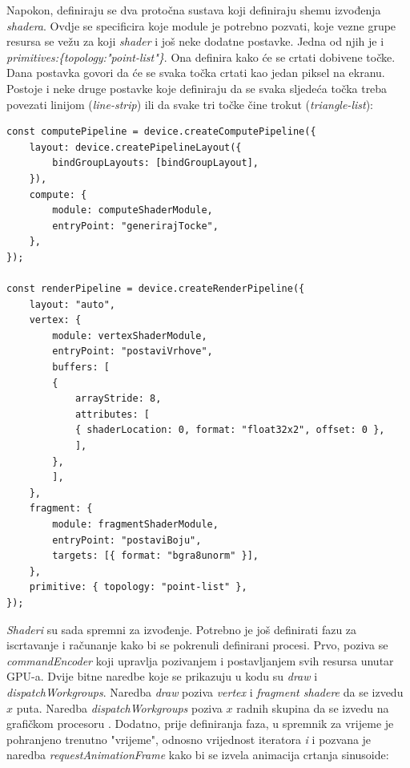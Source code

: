 \documentclass{foi}
\begin{document}
Napokon, definiraju se dva protočna sustava koji definiraju shemu izvođenja \textit{shadera}. Ovdje se specificira koje module je potrebno pozvati, koje vezne grupe resursa se vežu za koji \textit{shader} i još neke dodatne postavke. Jedna od njih je i \textit{primitives:\{topology:"point-list"\}}. Ona definira kako će se crtati dobivene točke. Dana postavka govori da će se svaka točka crtati kao jedan piksel na ekranu. Postoje i neke druge postavke koje definiraju da se svaka sljedeća točka treba povezati linijom (\textit{line-strip}) ili da svake tri točke čine trokut (\textit{triangle-list}):

\begin{verbatim}
const computePipeline = device.createComputePipeline({
	layout: device.createPipelineLayout({
		bindGroupLayouts: [bindGroupLayout],
	}),
	compute: {
		module: computeShaderModule,
		entryPoint: "generirajTocke",
	},
});

const renderPipeline = device.createRenderPipeline({
	layout: "auto",
	vertex: {
		module: vertexShaderModule,
		entryPoint: "postaviVrhove",
		buffers: [
		{
			arrayStride: 8,
			attributes: [
			{ shaderLocation: 0, format: "float32x2", offset: 0 },
			],
		},
		],
	},
	fragment: {
		module: fragmentShaderModule,
		entryPoint: "postaviBoju",
		targets: [{ format: "bgra8unorm" }],
	},
	primitive: { topology: "point-list" },
});
\end{verbatim}

\textit{Shaderi} su sada spremni za izvođenje. Potrebno je još definirati fazu za iscrtavanje i računanje kako bi se pokrenuli definirani procesi. Prvo, poziva se \textit{commandEncoder} koji upravlja pozivanjem i postavljanjem svih resursa unutar GPU-a. Dvije bitne naredbe koje se prikazuju u kodu su \textit{draw} i \textit{dispatchWorkgroups}. Naredba \textit{draw} poziva \textit{vertex} i \textit{fragment shadere} da se izvedu $x$ puta. Naredba \textit{dispatchWorkgroups} poziva $x$ radnih skupina da se izvedu na grafičkom procesoru \parencite{W3CWebGPU2024}. Dodatno, prije definiranja faza, u spremnik za vrijeme je pohranjeno trenutno "vrijeme", odnosno vrijednost iteratora \textit{i} i pozvana je naredba \textit{requestAnimationFrame} kako bi se izvela animacija crtanja sinusoide:
\end{document}
